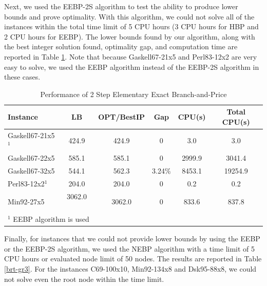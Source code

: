 \documentclass[graybox]{./styles/svmult}
\begin{document}
Next, we used the EEBP-2S algorithm to test the ability to produce
lower bounds and prove optimality. With this algorithm, we could not
solve all of the instances within the total time limit of 5 CPU hours (3 CPU 
hours for HBP and 2 CPU hours for EEBP). The
lower bounds found by our algorithm, along with the best integer
solution found, optimality gap, and computation time are reported in
Table \ref{brt-gr2}. Note that because Gaskell67-21x5 and Perl83-12x2
are very easy to solve, we used the EEBP algorithm instead of the
EEBP-2S algorithm in these cases.
\begin{table}[ht]
\centering
\caption{Performance of 2 Step Elementary Exact Branch-and-Price}\label{brt-gr2}
\begin {tabular}[t]{|l|c|c|c|c|c|}  
\hline
Instance	        &       LB	&	OPT/BestIP &	Gap    & CPU(s)	& 	Total CPU(s)	\\\hline
Gaskell67-21x5$^1$	&	424.9	&	424.9	&	0	&	3.0	&	3.0	\\
Gaskell67-22x5   	&	585.1	&	585.1	&	0	&	2999.9	&	3041.4	\\
Gaskell67-32x5  	&	544.1	&	562.3	&	3.24\%	&	8453.1	&	19254.9	\\
Perl83-12x2$^1$ 	&	204.0	&	204.0	&	0	&	0.2	&	0.2	\\
Min92-27x5      	&	3062.0 \ \ &	3062.0	&	0	&	833.6	&	837.8	\\
\hline
\multicolumn{6}{l}{$^1$ EEBP algorithm is used}\\
\end{tabular}
\end{table}

Finally, for instances that we could not provide lower bounds by using
the EEBP or the EEBP-2S algorithm, we used the NEBP algorithm with a
time limit of 5 CPU hours or evaluated node limit of 50 nodes. The
results are reported in Table \ref{brt-gr3}. For the instances
C69-100x10, Min92-134x8 and Dsk95-88x8, we could not solve even the
root node within the time limit. 
\end{document}
